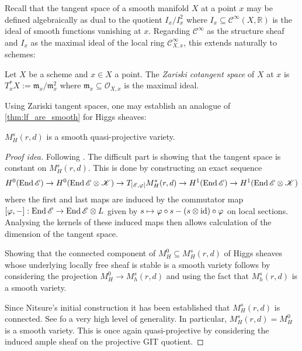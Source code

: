 \documentclass[12pt]{ociamthesis}  %
\begin{document}
Recall that the tangent space of a smooth manifold $X$ at a point $x$ may be
defined algebraically as dual to the quotient $I_x/I_x^2$ where
$I_x\subseteq\mathscr C^\infty(X,\mathbb R)$ is the ideal of smooth
functions vanishing at $x$. Regarding $\mathscr C^\infty$ as the
structure sheaf and $I_x$ as the maximal ideal of the local ring
$\mathscr C^\infty_{X,x}$, this extends naturally to schemes:

\begin{definition}
  Let $X$ be a scheme and $x\in X$ a point. The \emph{Zariski cotangent
    space} of $X$ at $x$ is $T_x^* X := \mathfrak m_x /\mathfrak m_x^2$
  where $\mathfrak m_x\subseteq\mathscr O_{X,x}$ is the maximal ideal.
\end{definition}

Using Zariski tangent spaces, one may establish an analogue of
\ref{thm:lf_are_smooth} for Higgs sheaves:

\begin{theorem}
  $M^s_H(r,d)$ is a smooth quasi-projective variety.
  \begin{proof}[Proof idea]
    Following \cite[296-298]{nitsure1991}. The difficult part is
    showing that the tangent space is constant on $M^s_H(r,d)$. This is
    done by constructing an exact sequence
    \begin{align*}
      H^0(\operatorname{End}\mathscr E)
      \to H^0(\operatorname{End}\mathscr E\otimes\mathscr K)
      \to T_{[\mathscr E,\varphi]}M^s_H(r,d)
      \to H^1(\operatorname{End}\mathscr E)
      \to H^1(\operatorname{End}\mathscr E\otimes\mathscr K)
    \end{align*}
    where the first and last maps are induced by the commutator map
    $[\varphi, -] : \operatorname{End}\mathscr E \to \operatorname{End}\mathscr E \otimes L$
    given by $s \mapsto \varphi\circ s - (s\otimes\operatorname{id})\circ\varphi$
    on local sections. Analysing the kernels of these induced
    maps then allows calculation of the dimension of the tangent
    space.

    Showing that the connected component of $M^0_H\subseteq M^s_H(r,d)$ of
    Higgs sheaves whose underlying locally free sheaf is stable is
    a smooth variety follows by considering the projection $M^0_H\to M^s_h(r,d)$
    and using the fact that $M^s_h(r,d)$ is a smooth variety.

    Since Nitsure's initial construction it has been established
    that $M^s_H(r,d)$ is connected. See \cite{gpo2016} fo a very
    high level of generality. In particular, $M^s_H(r,d) = M^0_H$ is
    a smooth variety. This is once again quasi-projective by
    considering the induced ample sheaf on the projective GIT
    quotient.
  \end{proof}
\end{theorem}
\end{document}

